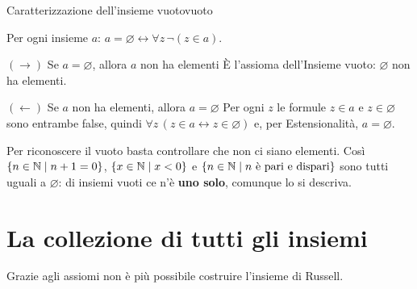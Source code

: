\begin{concetto}
\begin{Lemma}{Caratterizzazione dell'insieme vuoto}{vuoto}
    \begin{prerequisiti}
    \end{prerequisiti}
    Per ogni insieme $a$: \quad $a = \varnothing \leftrightarrow \forall z\,\neg(z \in a)$.
\end{Lemma}
\begin{dimostrazione}
    \begin{caso}{$(\rightarrow)$ Se $a = \varnothing$, allora $a$ non ha elementi}
        È l'assioma dell'Insieme vuoto: $\varnothing$ non ha elementi.
    \end{caso}
    \begin{caso}{$(\leftarrow)$ Se $a$ non ha elementi, allora $a = \varnothing$}
        Per ogni $z$ le formule $z \in a$ e $z \in \varnothing$ sono entrambe false, quindi
        $\forall z\,(z \in a \leftrightarrow z \in \varnothing)$ e, per Estensionalità, $a = \varnothing$.
    \end{caso}
\end{dimostrazione}
\end{concetto}

\begin{spiegazione}
    Per riconoscere il vuoto basta controllare che non ci siano elementi. Così $\{n \in \mathbb{N} \mid n + 1 = 0\}$, $\{x \in \mathbb{N} \mid x < 0\}$ e $\{n \in \mathbb{N} \mid n \text{ è pari e dispari}\}$
    sono tutti uguali a $\varnothing$: di insiemi vuoti ce n'è \textbf{uno solo}, comunque lo si descriva.
\end{spiegazione}


\section{La collezione di tutti gli insiemi}\label{sec:russell}

Grazie agli assiomi non è più possibile costruire l'insieme di Russell.

